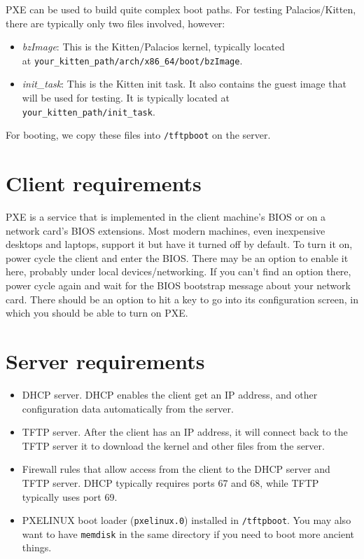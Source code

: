 \documentclass[11pt]{article}
\begin{document}
PXE can be used to build quite complex boot paths.   For testing
Palacios/Kitten, there are typically only two files involved, however:
\begin{itemize}
\item {\em  bzImage}:  This is the Kitten/Palacios kernel, typically
located\\
at \verb!your_kitten_path/arch/x86_64/boot/bzImage!.
\item {\em init\_task}:  This is the Kitten init task.   It also
contains the guest image that will be used for testing.  It is
typically located at \verb!your_kitten_path/init_task!. 
\end{itemize}

For booting, we copy these files into \verb./tftpboot. on the server. 


\section{Client requirements}

PXE is a service that is implemented in the client machine's BIOS or
on a network card's BIOS extensions.  Most modern machines, even
inexpensive desktops and laptops, support it but have it turned off by
default.  To turn it on, power cycle the client and enter the BIOS.
There may be an option to enable it here, probably under local
devices/networking.  If you can't find an option there, power cycle
again and wait for the BIOS bootstrap message about your network
card.  There should be an option to hit a key to go into its
configuration screen, in which you should be able to turn on PXE.  

\section{Server requirements}

\begin{itemize}
\item DHCP server. DHCP enables the client get an IP address, and
other configuration data automatically from the server.   
\item TFTP server.  After the client has an IP address, it will
connect back to the TFTP server it to download the kernel and other
files from the server.
\item Firewall rules that allow access from the client to the DHCP
server and TFTP server.  DHCP typically requires ports 67 and 68,
while TFTP typically uses port 69.
\item PXELINUX boot loader (\verb!pxelinux.0!) installed in
\verb./tftpboot..  You may also want to have \verb.memdisk. in the
same directory if you need to boot more ancient things. 
\end{itemize}
\end{document}
